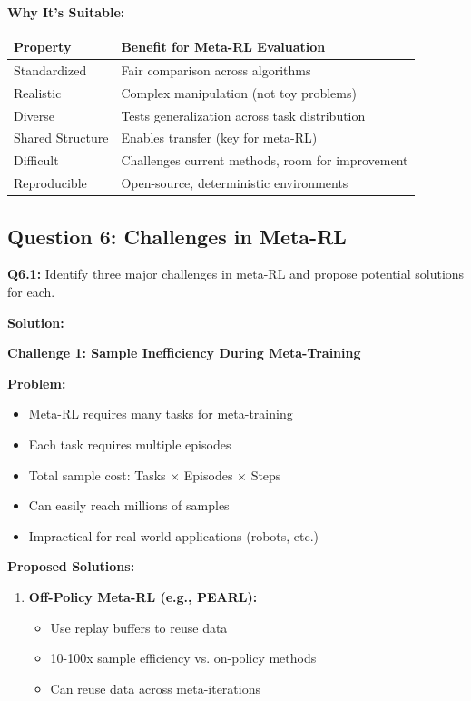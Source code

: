 \documentclass[12pt]{article}
\begin{document}
{{			\textbf{Why It's Suitable:}
			
			\begin{center}
			\begin{tabular}{|l|l|}
			\hline
			\textbf{Property} & \textbf{Benefit for Meta-RL Evaluation} \\
			\hline
			Standardized & Fair comparison across algorithms \\
			Realistic & Complex manipulation (not toy problems) \\
			Diverse & Tests generalization across task distribution \\
			Shared Structure & Enables transfer (key for meta-RL) \\
			Difficult & Challenges current methods, room for improvement \\
			Reproducible & Open-source, deterministic environments \\
			\hline
			\end{tabular}
			\end{center}
			
			\subsection{Question 6: Challenges in Meta-RL}
			
			\textbf{Q6.1:} Identify three major challenges in meta-RL and propose potential solutions for each.
			
			\textbf{Solution:}
			
			\textbf{Challenge 1: Sample Inefficiency During Meta-Training}
			
			\textbf{Problem:}
			\begin{itemize}
				\item Meta-RL requires many tasks for meta-training
				\item Each task requires multiple episodes
				\item Total sample cost: Tasks × Episodes × Steps
				\item Can easily reach millions of samples
				\item Impractical for real-world applications (robots, etc.)
			\end{itemize}
			
			\textbf{Proposed Solutions:}
			\begin{enumerate}
				\item \textbf{Off-Policy Meta-RL (e.g., PEARL):}
				\begin{itemize}
					\item Use replay buffers to reuse data
					\item 10-100x sample efficiency vs. on-policy methods
					\item Can reuse data across meta-iterations
				\end{itemize}
				

\end{enumerate}}}
\end{document}
